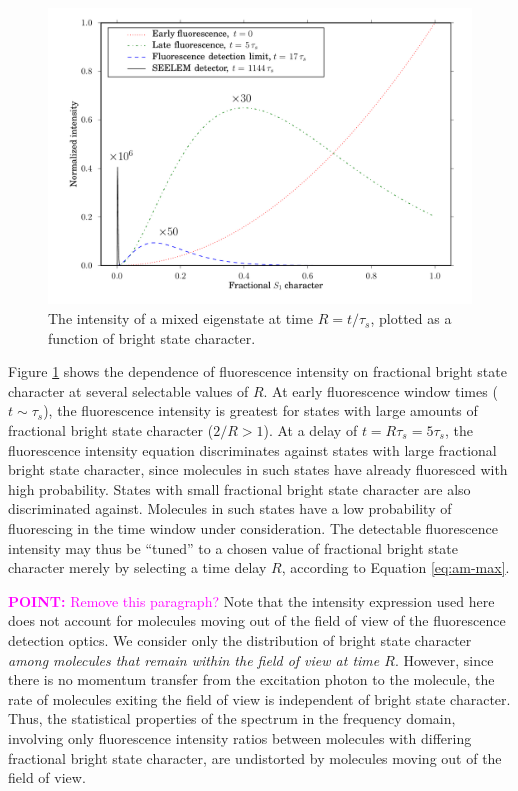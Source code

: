 \documentclass[12pt]{mitthesis}
\newcommand{\POINT}[1]{\textcolor{magenta}{\textbf{POINT:} #1}}
\begin{document}
\begin{figure}
  \caption{The intensity of a mixed eigenstate at time $R =
    t/\tau_s$, plotted as a function of bright
    state character.}
  \label{fig:int-at-rc}
  \centering
  \includegraphics[width=7.5in,angle=90]{intensity-at-delay.pdf}
\end{figure}

Figure \ref{fig:int-at-rc} shows the dependence of fluorescence
intensity on fractional bright state character at several selectable
values of $R$.  At early fluorescence window times ($t \sim \tau_s$),
the fluorescence intensity is greatest for states with large amounts
of fractional bright state character ($2/R > 1$).  At a delay of $t =
R \tau_s = 5 \tau_s$, the fluorescence intensity equation
discriminates against states with large fractional bright state
character, since molecules in such states have already fluoresced with
high probability.  States with small fractional bright state character
are also discriminated against.  Molecules in such states have a low
probability of fluorescing in the time window under consideration.
The detectable fluorescence intensity may thus be ``tuned'' to a
chosen value of fractional bright state character merely by selecting
a time delay $R$, according to Equation \ref{eq:am-max}.

\POINT{Remove this paragraph?}  Note that the intensity expression
used here does not account for molecules moving out of the field of
view of the fluorescence detection optics.  We consider only the
distribution of bright state character \emph{among molecules that
  remain within the field of view at time $R$}.  However, since there
is no momentum transfer from the excitation photon to the molecule,
the rate of molecules exiting the field of view is independent of
bright state character.  Thus, the statistical properties of the
spectrum in the frequency domain, involving only fluorescence
intensity ratios between molecules with differing fractional bright
state character, are undistorted by molecules moving out of the field
of view.
\end{document}
